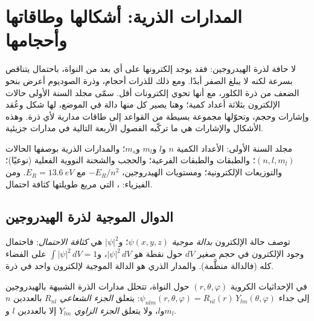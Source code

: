 \chapter{المدارات الذرية: أشكالها وطاقاتها وأحجامها}\label{ch:b2:atomic-orbitals}

لا حافة لذرة الهيدروجين: فقد يوجد إلكترونها على أي بعد من
النواة، باحتمال يتناقص بسرعة لكنه لا يبلغ الصفر أبدًا. ومع ذلك
للذرات أحجام، وذرة الصوديوم أعرض بنحو الضعف من ذرة
الكلور، مع أنها تحوي إلكترونات أقل. سمّى مجلد السنة الأولى
حالات الإلكترون بثلاثة أعداد كمية؛ وهنا يصير كل منها
دالة في الموضع، لها شكل وعُقد وإشارات وحجم، وتحوّلها مجموعة بسيطة
من القواعد إلى طاقات مدارية لأي ذرة. وهذه الأشكال والإشارات
هي ما تركّبه الفصول الأربعة التالية في مدارات جزيئية.

\begin{recall}
مجلد السنة الأولى: الأعداد الكمية $n$ و$l$ و$m_l$ و$m_s$؛ والمدارات الذرية بوصفها
الحالات $(n, l, m_l)$؛ والطبقات والطبقات الفرعية؛ والحجب والشحنة النووية
الفعلية (نوعيًا)؛ والتوزيعات الإلكترونية؛ ومستويات الهيدروجين،
$-E_R/n^2$ مع $E_R = \qty{13.6}{eV}$. ومن الفيزياء: ، التي
مربع طويلتها كثافة احتمال.
\end{recall}

\section{الدوال الموجية لذرة الهيدروجين}

\begin{definition}\label{def:b2:atomic-orbitals:wavefunction}
توصف حالة الإلكترون \emph{بدالة موجية}
$\psi(x, y, z)$؛ و$|\psi|^2$ هي \emph{كثافة الاحتمال}:
فاحتمال وجود الإلكترون في حجم صغير $dV$ حول
نقطة هو $|\psi|^2\,dV$، و$\int|\psi|^2\,dV = 1$ على الفضاء كله (فالدالة
منظَّمة). والمدار الذري هو الدالة الموجية لإلكترون واحد في
ذرة.
\end{definition}

\begin{definition}\label{def:b2:atomic-orbitals:radial-angular}
في الإحداثيات الكروية $(r, \theta, \varphi)$ حول النواة، تتحلل مدارات
الذرة الشبيهة بالهيدروجين إلى جداء $\psi_{nlm}(r, \theta, \varphi) = R_{nl}(r)\,
Y_{lm}(\theta, \varphi)$: يتعلق \emph{الجزء الشعاعي} $R_{nl}$
بالعددين $n$ و$l$، ولا يتعلق \emph{الجزء الزاوي} $Y_{lm}$ إلا بالعددين $l$ 
و$m_l$.
\end{definition}

